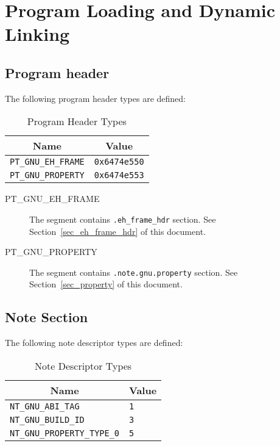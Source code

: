 \chapter{Program Loading and Dynamic Linking}

\section{Program header}

The following \xOS program header types are defined:

\begin{table}[H]
\Hrule
  \caption{Program Header Types}
  \begin{center}
    \begin{tabular}[t]{l|l}
      \multicolumn{1}{c}{Name} & \multicolumn{1}{c}{Value} \\
      \hline
      \texttt{PT_GNU_EH_FRAME} & \texttt{0x6474e550} \\
      \texttt{PT_GNU_PROPERTY} & \texttt{0x6474e553} \\
    \end{tabular}
  \end{center}
\Hrule
\end{table}

\begin{description}
 \item[PT_GNU_EH_FRAME]
      The segment contains \texttt{.eh_frame_hdr} section.  See
      Section~\ref{sec_eh_frame_hdr} of this document.
 \item[PT_GNU_PROPERTY]
      The segment contains \texttt{.note.gnu.property} section.  See
      Section~\ref{sec_property} of this document.
\end{description}

\section{Note Section}

The following note descriptor types are defined:

\begin{table}[H]
\Hrule
  \caption{Note Descriptor Types}
  \begin{center}
    \begin{tabular}[t]{l|l}
      \multicolumn{1}{c}{Name} & \multicolumn{1}{c}{Value} \\
      \hline
      \texttt{NT_GNU_ABI_TAG} & \texttt{1} \\
      \texttt{NT_GNU_BUILD_ID} & \texttt{3} \\
      \texttt{NT_GNU_PROPERTY_TYPE_0} & \texttt{5} \\
    \end{tabular}
  \end{center}
\Hrule
\end{table}

